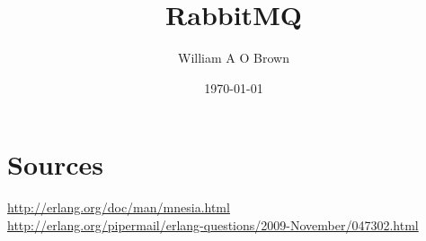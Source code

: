 \documentclass[a4paper,10pt]{article}
\begin{document}
\title{RabbitMQ}
\author{William A O Brown}
\date{\today}
\maketitle

\tableofcontents
\listoffigures

% 






\section{Sources}
\url{http://erlang.org/doc/man/mnesia.html} \\
\url{http://erlang.org/pipermail/erlang-questions/2009-November/047302.html} \\


\end{document}
